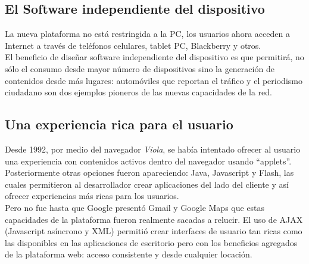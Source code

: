 \subsection{El Software independiente del dispositivo}
La nueva plataforma no está restringida a la PC, los usuarios ahora acceden a Internet a través de teléfonos celulares, tablet PC, Blackberry y otros.\\ 

El beneficio de diseñar software independiente del dispositivo es que permitirá, no sólo el consumo desde mayor número de dispositivos sino la generación de contenidos desde más lugares: automóviles que reportan el tráfico y el periodismo ciudadano son dos ejemplos pioneros de las nuevas capacidades de la red.

\subsection{Una experiencia rica para el usuario}
Desde 1992, por medio del navegador \emph{Viola}, se había intentado ofrecer al usuario una experiencia con contenidos activos dentro del navegador usando ``applets''. Posteriormente otras opciones fueron apareciendo: Java, Javascript y Flash, las cuales permitieron al desarrollador crear aplicaciones del lado del cliente y así ofrecer experiencias más ricas para los usuarios.\\

Pero no fue hasta que Google presentó Gmail y Google Maps que estas capacidades de la plataforma fueron realmente sacadas a relucir. El uso de AJAX (Javascript asíncrono y XML) permitió crear interfaces de usuario tan ricas como las disponibles en las aplicaciones de escritorio pero con los beneficios agregados de la plataforma web: acceso consistente y desde cualquier locación.
